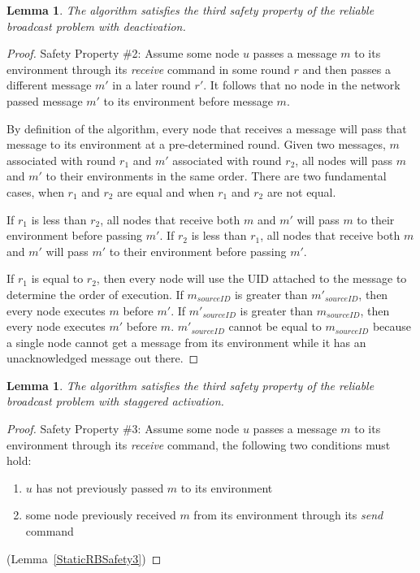 \documentclass[english]{article}
\newtheorem{lemma}[theorem]{Lemma}
\begin{document}
\begin{lemma}
\label{DeactivationRBSafety2}
The algorithm satisfies the third safety property of the reliable broadcast problem with deactivation.
\end{lemma}
\begin{proof}
Safety Property \#2: Assume some node $u$ passes a message $m$ to its environment through its \textit{receive} command in some round $r$ and then passes a different message $m'$ in a later round $r'$. It follows that no node in the network passed message $m'$ to its environment before message $m$. 

By definition of the algorithm, every node that receives a message will pass that message to its environment at a pre-determined round. Given two messages, $m$ associated with round $r_1$ and $m'$ associated with round $r_2$, all nodes will pass $m$ and $m'$ to their environments in the same order. There are two fundamental cases, when $r_1$ and $r_2$ are equal and when $r_1$ and $r_2$ are not equal. 

If $r_1$ is less than $r_2$, all nodes that receive both $m$ and $m'$ will pass $m$ to their environment before passing $m'$. If $r_2$ is less than $r_1$, all nodes that receive both $m$ and $m'$ will pass $m'$ to their environment before passing $m'$.

If $r_1$ is equal to $r_2$, then every node will use the UID attached to the message to determine the order of execution. If $m_{sourceID}$ is greater than $m'_{sourceID}$, then every node executes $m$ before $m'$. If $m'_{sourceID}$ is greater than $m_{sourceID}$, then every node executes $m'$ before $m$. $m'_{sourceID}$ cannot be equal to $m_{sourceID}$ because a single node cannot get a message from its environment while it has an unacknowledged message out there.



\end{proof}


\begin{lemma}
\label{DeactivationRBSafety3}
The algorithm satisfies the third safety property of the reliable broadcast problem with staggered activation.
\end{lemma}
\begin{proof}
Safety Property \#3: Assume some node $u$ passes a message $m$ to its environment through its \textit{receive} command, the following two conditions must hold:
  \begin {enumerate}
    \item $u$ has not previously passed $m$ to its environment
    \item some node previously received $m$ from its environment through its \textit{send} command
  \end{enumerate}

(Lemma~\ref{StaticRBSafety3})


\end{proof}
\end{document}
